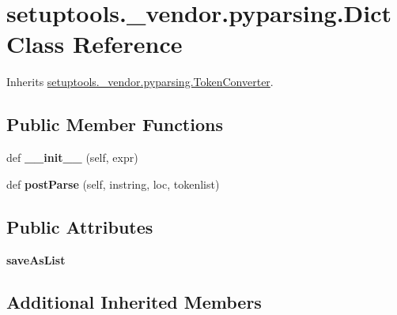 \hypertarget{classsetuptools_1_1__vendor_1_1pyparsing_1_1_dict}{}\section{setuptools.\+\_\+vendor.\+pyparsing.\+Dict Class Reference}
\label{classsetuptools_1_1__vendor_1_1pyparsing_1_1_dict}


Inherits \hyperlink{classsetuptools_1_1__vendor_1_1pyparsing_1_1_token_converter}{setuptools.\+\_\+vendor.\+pyparsing.\+Token\+Converter}.

\subsection*{Public Member Functions}
\begin{DoxyCompactItemize}
\item 
\mbox{\label{classsetuptools_1_1__vendor_1_1pyparsing_1_1_dict_a7b96a2cdf8381779910b2c41b782a5a2}} 
def {\bfseries \+\_\+\+\_\+init\+\_\+\+\_\+} (self, expr)
\item 
\mbox{\label{classsetuptools_1_1__vendor_1_1pyparsing_1_1_dict_a22a8dfcf1dca19517641cb9590e1683d}} 
def {\bfseries post\+Parse} (self, instring, loc, tokenlist)
\end{DoxyCompactItemize}
\subsection*{Public Attributes}
\begin{DoxyCompactItemize}
\item 
\mbox{\label{classsetuptools_1_1__vendor_1_1pyparsing_1_1_dict_ae7582c1907de5c66fdced28823a533a0}} 
{\bfseries save\+As\+List}
\end{DoxyCompactItemize}
\subsection*{Additional Inherited Members}



